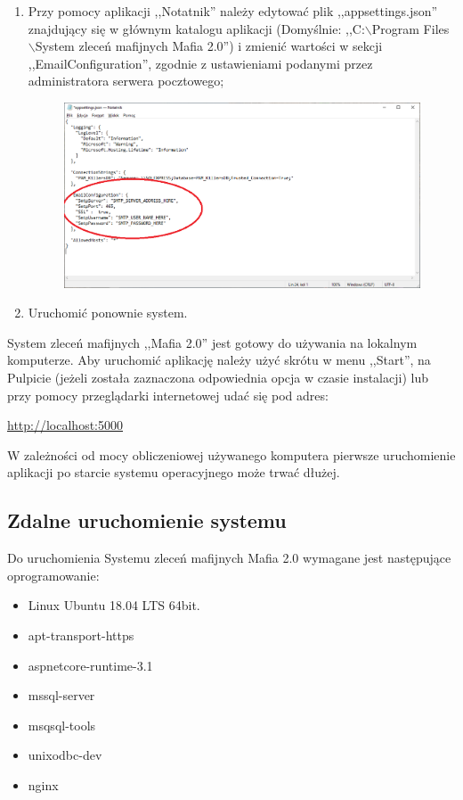 \documentclass[12pt,a4paper]{article}
\begin{document}
\begin{enumerate}
				\item Przy pomocy aplikacji ,,Notatnik'' należy edytować plik ,,appsettings.json'' znajdujący się w głównym katalogu aplikacji (Domyślnie:
					,,C:$\backslash$Program Files$\backslash$System zleceń mafijnych Mafia 2.0'') i zmienić wartości w sekcji ,,EmailConfiguration'', zgodnie z ustawieniami podanymi
					przez administratora serwera pocztowego;\\
					\begin{figure}[H]
						\centering
						\includegraphics[scale=0.5]{img/Local_Install_13.png}
					\end{figure}				
					
				\item Uruchomić ponownie system.
			\end{enumerate}
			System zleceń mafijnych ,,Mafia 2.0'' jest gotowy do używania na lokalnym komputerze. Aby uruchomić aplikację należy użyć skrótu w menu ,,Start'', na Pulpicie (jeżeli została
			zaznaczona odpowiednia opcja w czasie instalacji) lub przy pomocy przeglądarki internetowej udać się pod adres:
			\begin{tcolorbox}[minipage,colback=white,arc=0pt,outer arc=0pt, fontupper=\footnotesize]
				\url {http://localhost:5000}
			\end{tcolorbox}
			W zależności od mocy obliczeniowej używanego komputera pierwsze uruchomienie aplikacji po starcie systemu operacyjnego może trwać dłużej.		
		
		\subsection{Zdalne uruchomienie systemu}
			\indent Do uruchomienia Systemu zleceń mafijnych Mafia 2.0 wymagane jest następujące oprogramowanie:
			\begin{itemize}
				\item Linux Ubuntu 18.04 LTS 64bit.
				\item apt-transport-https
				\item aspnetcore-runtime-3.1
				\item mssql-server
				\item msqsql-tools
				\item unixodbc-dev
				\item nginx
			\end{itemize}
			
\end{document}
